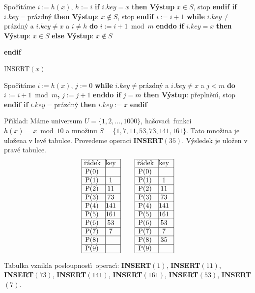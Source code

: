 \documentclass[a4paper,12pt]{article}
\begin{document}
\newline 
Spo\v c\'\i t\'ame $i:=h(x)$, $h:=i$\newline 
{\bf if} $i.key=x$ {\bf then V\'ystup} $x\in S$, stop {\bf endif\newline 
if} $i.key=$pr\'azdn\'y {\bf then {{\rm V\'ystup}}}: $x\notin S$, stop {\bf endif\newline 
$i:=i+1$\newline 
while} $i.key\ne$pr\'azdn\'y a $i.key\ne x$ a $i\ne h$ {\bf do} $
i:=i+1\bmod m$ {\bf enddo\newline 
if} $i.key=x$ {\bf then V\'ystup}: $x\in S$ {\bf else V\'ystup}: $
x\notin S$ {\bf endif
\bigskip

\flushpar INSERT$(x)$}\newline 
Spo\v c\'\i t\'ame $i:=h(x)$, $j:=0$\newline 
{\bf while} $i.key\ne$pr\'azdn\'y a $i.key\ne x$ a $j<m$ {\bf do} $
i:=i+1\bmod m${\bf ,} $j:=j+1$ {\bf enddo\newline 
if} $j=m$ {\bf then V\'ystup}: p\v repln\v en\'\i , stop {\bf endif\newline 
if} $i.key=$pr\'azdn\'y {\bf then} $i.key:=x$ {\bf endif}
\bigskip

\flushpar P\v r\'\i klad: M\'ame universum $U=\{1,2,\dots,1000\}$, 
ha\v sovac\'\i\ funk\-ci $h(x)=x\bmod10$ a mno\v zinu  
$S=\{1,7,11,53,73,141,161\}$. Tato mno\v zina je ulo\v zena v lev\'e tabulce. 
Provedeme operaci {\bf INSERT$(35)$}. V\'ysledek je ulo\v zen v 
prav\'e tabulce.
$$\vbox {\hbox{\vtop{\offinterlineskip\halign{\strut\vrule\ # & \vrule\hfil# \hfil\vrule\cr\noalign{\hrule}\v r\'adek & key \hfil\cr\noalign{\hrule}P(0) & \hfill \cr\noalign{\hrule}P(1) & 1 \cr\noalign{\hrule}P(2) & 11 \cr\noalign{\hrule}P(3) & 73 \cr\noalign{\hrule}P(4) & 141 \cr\noalign{\hrule}P(5) & 161 \cr\noalign{\hrule}P(6) & 53 \cr\noalign{\hrule}P(7) & 7 \cr\noalign{\hrule}P(8) & \hfill\cr\noalign{\hrule}P(9) & \hfill \cr\noalign{\hrule}}}\qquad\vtop{\offinterlineskip\halign {\strut\vrule\ # & \vrule \hfil # \hfil \vrule\cr\noalign{\hrule}\v r\'adek & key \hfil \cr\noalign{\hrule}P(0) & \hfill \cr\noalign{\hrule}P(1) & 1 \cr\noalign{\hrule}P(2) & 11 \cr\noalign{\hrule}P(3) & 73 \cr\noalign{\hrule}P(4) & 141 \cr\noalign{\hrule}P(5) & 161 \cr\noalign{\hrule}P(6) & 53 \cr\noalign{\hrule}P(7) & 7 \cr\noalign{\hrule}P(8) & 35  \cr\noalign{\hrule}P(9) & \hfill \cr\noalign{\hrule}}}}}$$

\flushpar Tabulka vznikla posloupnost\'\i\ operac\'\i :\newline 
{\bf INSERT$(1)$}, {\bf INSERT$(11)$}, {\bf INSERT$(73)$}, 
{\bf INSERT$(141)$}, {\bf INSERT$(161)$},\newline 
{\bf INSERT$(53)$}, {\bf INSERT$(7)$}. 
\end{document}

